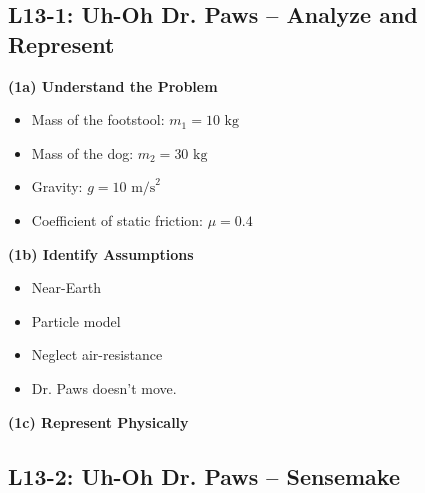 \documentclass[]{article}
\newcommand{\Week}{13}
\begin{document}
\newpage
\begin{TeacherMargin}

\end{TeacherMargin}
\begin{PresentSpace}
\vspace{-10pt}
\section*{L\Week-1: Uh-Oh Dr. Paws -- Analyze and Represent}
\vspace{-10pt}
\begin{multicols}{2}
	\textbf{(1a) Understand the Problem}
	\begin{itemize}
		\large
		\item Mass of the footstool: $m_{1}=10\text{ kg}$
		\item Mass of the dog: $m_{2}=30\text{ kg}$
		\item Gravity: $g=10\text{ m/s}^{2}$
		\item Coefficient of static friction: $\mu=0.4$
	\end{itemize}
	\textbf{(1b) Identify Assumptions}
	\begin{itemize}
		\large
		\item Near-Earth
		\item Particle model
		\item Neglect air-resistance
		\item Dr. Paws doesn't move.
	\end{itemize}
	\textbf{(1c) Represent Physically}
	\begin{center}
	\end{center}
\end{multicols}
\end{PresentSpace}
\newpage
\begin{TeacherMargin}

\end{TeacherMargin}
\begin{PresentSpace}
\vspace{-10pt}
\section*{L\Week-2: Uh-Oh Dr. Paws -- Sensemake}
\vspace{-10pt}

\end{PresentSpace}
\end{document}
